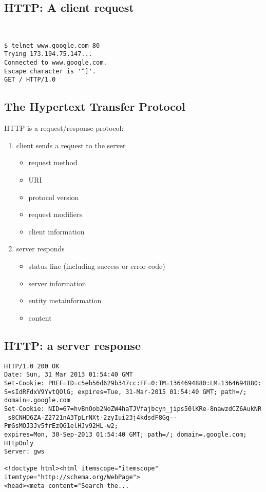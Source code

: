\documentclass[xga]{xdvislides}
\begin{document}
\subsection{HTTP: A client request}
\vspace*{.5in}
\\
\Hugesize
\begin{center}
\begin{verbatim}
$ telnet www.google.com 80
Trying 173.194.75.147...
Connected to www.google.com.
Escape character is '^]'.
GET / HTTP/1.0
\end{verbatim}
\end{center}
\Normalsize
\vspace*{\fill}


\subsection{The Hypertext Transfer Protocol}
HTTP is a request/response protocol:
\begin{enumerate}
	\item client sends a request to the server
		\begin{itemize}
			\item request method
			\item URI
			\item protocol version
			\item request modifiers
			\item client information
		\end{itemize}
	\item server responds
		\begin{itemize}
			\item status line (including success or error code)
			\item server information
			\item entity metainformation
			\item content
		\end{itemize}
\end{enumerate}

\subsection{HTTP: a server response}
\begin{verbatim}
HTTP/1.0 200 OK
Date: Sun, 31 Mar 2013 01:54:40 GMT
Set-Cookie: PREF=ID=c5eb56d629b347cc:FF=0:TM=1364694880:LM=1364694880:
S=sIdRFdxV9YvtQOlG; expires=Tue, 31-Mar-2015 01:54:40 GMT; path=/;
domain=.google.com
Set-Cookie: NID=67=hvBnOob2NoZW4haTJVfajbcyn_jips50lKRe-8nawzdCZ6AukNR
_s8CNHD6ZA-Z2721nA3TpLrNXt-2zyIui23j4kdsdF8Gg--PmGsMOJ3Jv5frEzQG1elHJv92HL-w2;
expires=Mon, 30-Sep-2013 01:54:40 GMT; path=/; domain=.google.com; HttpOnly
Server: gws

<!doctype html><html itemscope="itemscope" itemtype="http://schema.org/WebPage">
<head><meta content="Search the...

\end{verbatim}
\end{document}
